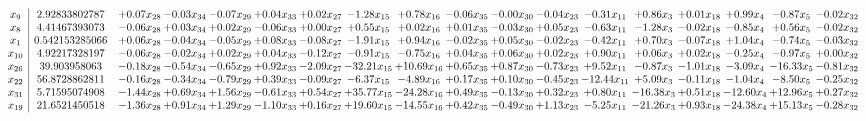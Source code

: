 \documentclass[9pt]{article}
\begin{document}
 \[\begin{array}{c| c c@{\hskip 2pt} c@{\hskip 2pt} c@{\hskip 2pt} c@{\hskip 2pt} c@{\hskip 2pt} c@{\hskip 2pt} c@{\hskip 2pt} c@{\hskip 2pt} c@{\hskip 2pt} c@{\hskip 2pt} c@{\hskip 2pt} c@{\hskip 2pt} c@{\hskip 2pt} c@{\hskip 2pt} c@{\hskip 2pt} c@{\hskip 2pt} }
 x_{9}   &  2.92833802787 & +  0.07 x_{28} & -0.03 x_{34} & -0.07 x_{29} & +  0.04 x_{33} & +  0.02 x_{27} & -1.28 x_{15} & +  0.78 x_{16} & -0.06 x_{35} & -0.00 x_{30} & -0.04 x_{23} & -0.31 x_{11} & +  0.86 x_{3} & +  0.01 x_{18} & +  0.99 x_{4} & -0.87 x_{5} & -0.02 x_{32}\\
 x_{8}   &  4.41467393073 & -0.06 x_{28} & +  0.03 x_{34} & +  0.02 x_{29} & -0.06 x_{33} & +  0.00 x_{27} & +  0.55 x_{15} & +  0.02 x_{16} & +  0.01 x_{35} & -0.03 x_{30} & +  0.05 x_{23} & -0.63 x_{11} & -1.28 x_{3} & -0.02 x_{18} & -0.85 x_{4} & +  0.56 x_{5} & -0.02 x_{32}\\
 x_{1}   &  0.542153285066 & +  0.06 x_{28} & -0.04 x_{34} & -0.05 x_{29} & +  0.08 x_{33} & -0.08 x_{27} & -1.91 x_{15} & +  0.94 x_{16} & -0.02 x_{35} & +  0.05 x_{30} & -0.02 x_{23} & -0.42 x_{11} & +  0.70 x_{3} & -0.07 x_{18} & +  1.04 x_{4} & -0.74 x_{5} & -0.03 x_{32}\\
 x_{10}   &  4.92217328197 & -0.06 x_{28} & -0.02 x_{34} & +  0.02 x_{29} & +  0.04 x_{33} & -0.12 x_{27} & -0.91 x_{15} & -0.75 x_{16} & +  0.04 x_{35} & +  0.06 x_{30} & +  0.02 x_{23} & +  0.90 x_{11} & +  0.06 x_{3} & +  0.02 x_{18} & -0.25 x_{4} & -0.97 x_{5} & +  0.00 x_{32}\\
 x_{26}   &  39.903958063 & -0.18 x_{28} & -0.54 x_{34} & -0.65 x_{29} & +  0.92 x_{33} & -2.09 x_{27} & -32.21 x_{15} & + 10.69 x_{16} & +  0.65 x_{35} & +  0.87 x_{30} & -0.73 x_{23} & +  9.52 x_{11} & -0.87 x_{3} & -1.01 x_{18} & -3.09 x_{4} & -16.33 x_{5} & -0.81 x_{32}\\
 x_{22}   &  56.8728862811 & -0.16 x_{28} & -0.34 x_{34} & -0.79 x_{29} & +  0.39 x_{33} & -0.09 x_{27} & -6.37 x_{15} & -4.89 x_{16} & +  0.17 x_{35} & +  0.10 x_{30} & -0.45 x_{23} & -12.44 x_{11} & +  5.09 x_{3} & -0.11 x_{18} & -1.04 x_{4} & -8.50 x_{5} & -0.25 x_{32}\\
 x_{31}   &  5.71595074908 & -1.44 x_{28} & +  0.69 x_{34} & +  1.56 x_{29} & -0.61 x_{33} & +  0.54 x_{27} & + 35.77 x_{15} & -24.28 x_{16} & +  0.49 x_{35} & -0.13 x_{30} & +  0.32 x_{23} & +  0.80 x_{11} & -16.38 x_{3} & +  0.51 x_{18} & -12.60 x_{4} & + 12.96 x_{5} & +  0.27 x_{32}\\
 x_{19}   &  21.6521450518 & -1.36 x_{28} & +  0.91 x_{34} & +  1.29 x_{29} & -1.10 x_{33} & +  0.16 x_{27} & + 19.60 x_{15} & -14.55 x_{16} & +  0.42 x_{35} & -0.49 x_{30} & +  1.13 x_{23} & -5.25 x_{11} & -21.26 x_{3} & +  0.93 x_{18} & -24.38 x_{4} & + 15.13 x_{5} & -0.28 x_{32}\\

\end{array}\]
\end{document}
